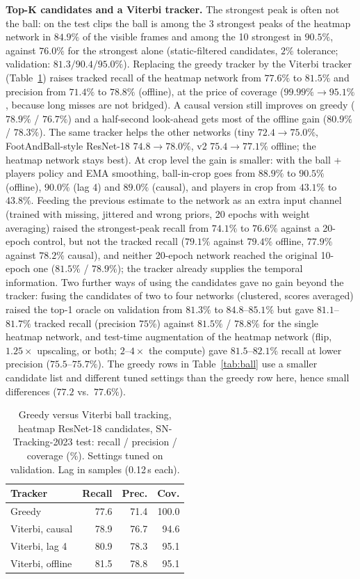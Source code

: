 \documentclass[conference]{IEEEtran}
\begin{document}
\textbf{Top-K candidates and a Viterbi tracker.} The strongest peak is often not the ball: on the test clips the ball is among the 3 strongest peaks of the heatmap network in $84.9\%$ of the visible frames and among the 10 strongest in $90.5\%$, against $76.0\%$ for the strongest alone (static-filtered candidates, $2\%$ tolerance; validation: $81.3 / 90.4 / 95.0\%$). Replacing the greedy tracker by the Viterbi tracker (Table~\ref{tab:vit}) raises tracked recall of the heatmap network from $77.6\%$ to $81.5\%$ and precision from $71.4\%$ to $78.8\%$ (offline), at the price of coverage ($99.99\%\to95.1\%$, because long misses are not bridged). A causal version still improves on greedy ($78.9\%$ / $76.7\%$) and a half-second look-ahead gets most of the offline gain ($80.9\%$ / $78.3\%$). The same tracker helps the other networks (tiny $72.4\to75.0\%$, FootAndBall-style ResNet-18 $74.8\to78.0\%$, v2 $75.4\to77.1\%$ offline; the heatmap network stays best). At crop level the gain is smaller: with the ball + players policy and EMA smoothing, ball-in-crop goes from $88.9\%$ to $90.5\%$ (offline), $90.0\%$ (lag 4) and $89.0\%$ (causal), and players in crop from $43.1\%$ to $43.8\%$. Feeding the previous estimate to the network as an extra input channel (trained with missing, jittered and wrong priors, 20 epochs with weight averaging) raised the strongest-peak recall from $74.1\%$ to $76.6\%$ against a 20-epoch control, but not the tracked recall ($79.1\%$ against $79.4\%$ offline, $77.9\%$ against $78.2\%$ causal), and neither 20-epoch network reached the original 10-epoch one ($81.5\%$ / $78.9\%$); the tracker already supplies the temporal information. Two further ways of using the candidates gave no gain beyond the tracker: fusing the candidates of two to four networks (clustered, scores averaged) raised the top-1 oracle on validation from $81.3\%$ to $84.8$--$85.1\%$ but gave $81.1$--$81.7\%$ tracked recall (precision $75$\%) against $81.5\%$ / $78.8\%$ for the single heatmap network, and test-time augmentation of the heatmap network (flip, $1.25\times$ upscaling, or both; $2$--$4\times$ the compute) gave $81.5$--$82.1\%$ recall at lower precision ($75.5$--$75.7\%$). The greedy rows in Table~\ref{tab:ball} use a smaller candidate list and different tuned settings than the greedy row here, hence small differences ($77.2$ vs.\ $77.6\%$).

\begin{table}[t]
\centering
\caption{Greedy versus Viterbi ball tracking, heatmap ResNet-18 candidates, SN-Tracking-2023 test: recall / precision / coverage (\%). Settings tuned on validation. Lag in samples (0.12\,s each).}
\label{tab:vit}
\begin{tabular}{lrrr}
\toprule
Tracker & Recall & Prec. & Cov.\\
\midrule
Greedy & 77.6 & 71.4 & 100.0 \\
Viterbi, causal & 78.9 & 76.7 & 94.6 \\
Viterbi, lag 4 & 80.9 & 78.3 & 95.1 \\
Viterbi, offline & 81.5 & 78.8 & 95.1 \\
\bottomrule
\end{tabular}
\end{table}
\end{document}
